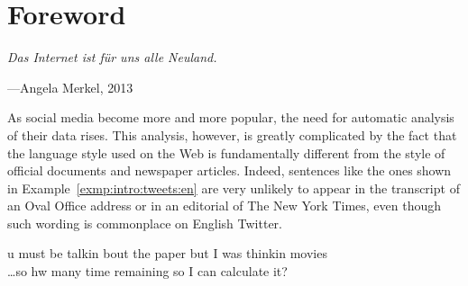 

\chapter*{Foreword}

\hspace*{\fill}\epigraph{\itshape Das Internet ist f\"ur uns alle
  Neuland.}{---Angela Merkel, 2013}

As social media become more and more popular, the need for automatic
analysis of their data rises.  This analysis, however, is greatly
complicated by the fact that the language style used on the Web is
fundamentally different from the style of official documents and
newspaper articles.  Indeed, sentences like the ones shown in
Example~\ref{exmp:intro:tweets:en} \cite[provided by][]{HanBaldwin:11}
are very unlikely to appear in the transcript of an Oval Office
address or in an editorial of The New York Times, even though such
wording is commonplace on English Twitter.
\begin{example}\label{exmp:intro:tweets:en}
u must be talkin bout the paper but I was thinkin movies\\
\dots so hw many time remaining so I can calculate it?
\end{example}


